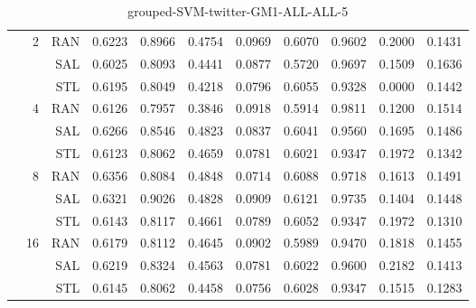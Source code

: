 \begin{center}
\begin{table}[htbp]
\begin{center}
\begin{tabular}{ | r | r | r | r | r | r | r | r | r | r | r |}
 & \multirow{3}{*}{2} & RAN & 0.6223 & 0.8966 & 0.4754 & 0.0969 & 0.6070 & 0.9602 & 0.2000 & 0.1431\\ \cline{3-11}
 &   & SAL & 0.6025 & 0.8093 & 0.4441 & 0.0877 & 0.5720 & 0.9697 & 0.1509 & 0.1636\\ \cline{3-11}
 &   & STL & 0.6195 & 0.8049 & 0.4218 & 0.0796 & 0.6055 & 0.9328 & 0.0000 & 0.1442\\ \cline{2-11}
 & \multirow{3}{*}{4} & RAN & 0.6126 & 0.7957 & 0.3846 & 0.0918 & 0.5914 & 0.9811 & 0.1200 & 0.1514\\ \cline{3-11}
 &   & SAL & 0.6266 & 0.8546 & 0.4823 & 0.0837 & 0.6041 & 0.9560 & 0.1695 & 0.1486\\ \cline{3-11}
 &   & STL & 0.6123 & 0.8062 & 0.4659 & 0.0781 & 0.6021 & 0.9347 & 0.1972 & 0.1342\\ \cline{2-11}
 & \multirow{3}{*}{8} & RAN & 0.6356 & 0.8084 & 0.4848 & 0.0714 & 0.6088 & 0.9718 & 0.1613 & 0.1491\\ \cline{3-11}
 &   & SAL & 0.6321 & 0.9026 & 0.4828 & 0.0909 & 0.6121 & 0.9735 & 0.1404 & 0.1448\\ \cline{3-11}
 &   & STL & 0.6143 & 0.8117 & 0.4661 & 0.0789 & 0.6052 & 0.9347 & 0.1972 & 0.1310\\ \cline{2-11}
 & \multirow{3}{*}{16} & RAN & 0.6179 & 0.8112 & 0.4645 & 0.0902 & 0.5989 & 0.9470 & 0.1818 & 0.1455\\ \cline{3-11}
 &   & SAL & 0.6219 & 0.8324 & 0.4563 & 0.0781 & 0.6022 & 0.9600 & 0.2182 & 0.1413\\ \cline{3-11}
 &   & STL & 0.6145 & 0.8062 & 0.4458 & 0.0756 & 0.6028 & 0.9347 & 0.1515 & 0.1283\\ \cline{2-11}
\hline
\end{tabular}
\caption{grouped-SVM-twitter-GM1-ALL-ALL-5}
\end{center}
 \end{table}
\end{center}

